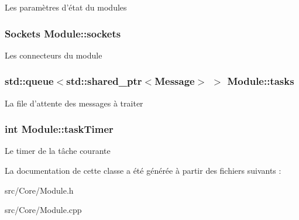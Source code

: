 Les paramètres d'état du modules \hypertarget{classModule_af0415ddaab230958f91665c66b078085}{
\subsubsection[{sockets}]{\setlength{\rightskip}{0pt plus 5cm}Sockets Module\-::sockets\hspace{0.3cm}{\ttfamily [protected]}}}\label{classModule_af0415ddaab230958f91665c66b078085}
Les connecteurs du module \hypertarget{classModule_a93e833bd46e53a2d52ab63afb304b840}{
\subsubsection[{tasks}]{\setlength{\rightskip}{0pt plus 5cm}std\-::queue$<$std\-::shared\-\_\-ptr$<${\bf Message}$>$ $>$ Module\-::tasks\hspace{0.3cm}{\ttfamily [protected]}}}\label{classModule_a93e833bd46e53a2d52ab63afb304b840}
La file d'attente des messages à traiter \hypertarget{classModule_afc209c4f9120425219f7775c79cf4bea}{
\subsubsection[{task\-Timer}]{\setlength{\rightskip}{0pt plus 5cm}int Module\-::task\-Timer\hspace{0.3cm}{\ttfamily [protected]}}}\label{classModule_afc209c4f9120425219f7775c79cf4bea}
Le timer de la tâche courante 

La documentation de cette classe a été générée à partir des fichiers suivants \-:\begin{DoxyCompactItemize}
\item 
src/\-Core/Module.\-h\item 
src/\-Core/Module.\-cpp\end{DoxyCompactItemize}
